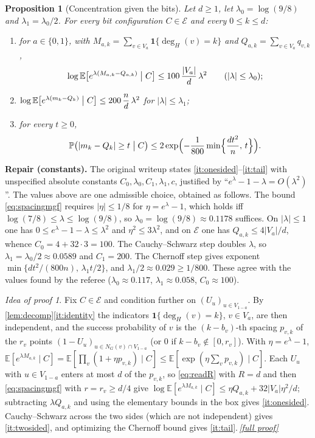 \documentclass[11pt,a4paper]{article}
\theoremstyle{plain}
\newtheorem{proposition}[theorem]{Proposition}
\theoremstyle{definition}
\theoremstyle{remark}
\newtheorem*{proofidea}{Idea of proof}
\newcommand{\fullproofref}[1]{\,\hyperref[#1]{\textit{[full proof]}}}
\newcommand{\EE}{\mathbb E}
\newcommand{\PP}{\mathbb P}
\newcommand{\ind}{\mathbf 1}
\newcommand{\cE}{\mathcal E}
\newcommand{\degH}{\deg_H}
\begin{document}
\begin{proposition}[Concentration given the bits]\label{prop:givenbits}
Let $d\ge1$, let $\lambda_0=\log(9/8)$ and $\lambda_1=\lambda_0/2$. For every bit configuration $C\in\cE$ and every $0\le k\le d$:
\begin{enumerate}[label=\textup{(\alph*)},itemsep=1pt]
\item\label{it:onesided} for $a\in\{0,1\}$, with $M_{a,k}=\sum_{v\in V_a}\ind\{\degH(v)=k\}$ and $Q_{a,k}=\sum_{v\in V_a}q_{v,k}$,
\[
 \log\EE\bigl[e^{\lambda(M_{a,k}-Q_{a,k})}\bigm|C\bigr]\le100\,\frac{|V_a|}d\,\lambda^2\qquad(|\lambda|\le\lambda_0);
\]
\item\label{it:twosided} $\log\EE\bigl[e^{\lambda(m_k-Q_k)}\bigm|C\bigr]\le200\,\dfrac nd\,\lambda^2$ for $|\lambda|\le\lambda_1$;
\item\label{it:tail} for every $t\ge0$,
\[
 \PP\bigl(|m_k-Q_k|\ge t\bigm|C\bigr)\le2\exp\Bigl(-\frac1{800}\min\Bigl\{\frac{dt^2}n,\,t\Bigr\}\Bigr).
\]
\end{enumerate}
\end{proposition}

\begin{repairbox}
\textbf{Repair (constants).} The original writeup states \ref{it:onesided}--\ref{it:tail} with unspecified absolute constants $C_0,\lambda_0,C_1,\lambda_1,c$, justified by ``$e^\lambda-1-\lambda=O(\lambda^2)$''. The values above are one admissible choice, obtained as follows. The bound \eqref{eq:spacingmgf} requires $|\eta|\le1/8$ for $\eta=e^\lambda-1$, which holds iff $\log(7/8)\le\lambda\le\log(9/8)$, so $\lambda_0=\log(9/8)\approx0.1178$ suffices. On $|\lambda|\le1$ one has $0\le e^\lambda-1-\lambda\le\lambda^2$ and $\eta^2\le3\lambda^2$, and on $\cE$ one has $Q_{a,k}\le4|V_a|/d$, whence $C_0=4+32\cdot3=100$. The Cauchy--Schwarz step doubles $\lambda$, so $\lambda_1=\lambda_0/2\approx0.0589$ and $C_1=200$. The Chernoff step gives exponent $\min\{dt^2/(800n),\,\lambda_1t/2\}$, and $\lambda_1/2\approx0.029\ge1/800$. These agree with the values found by the referee ($\lambda_0\approx0.117$, $\lambda_1\approx0.058$, $C_0\approx100$).
\end{repairbox}

\begin{proofidea}
Fix $C\in\cE$ and condition further on $(U_u)_{u\in V_{1-a}}$. By \cref{lem:decomp}\ref{it:identity} the indicators $\ind\{\degH(v)=k\}$, $v\in V_a$, are then independent, and the success probability of $v$ is the $(k-b_v)$-th spacing $p_{v,k}$ of the $r_v$ points $(1-U_u)_{u\in N_G(v)\cap V_{1-a}}$ (or $0$ if $k-b_v\notin[0,r_v]$). With $\eta=e^\lambda-1$, $\EE[e^{\lambda M_{a,k}}\mid C]=\EE[\prod_v(1+\eta p_{v,k})\mid C]\le\EE[\exp(\eta\sum_v p_{v,k})\mid C]$. Each $U_u$ with $u\in V_{1-a}$ enters at most $d$ of the $p_{v,k}$, so \eqref{eq:readR} with $R=d$ and then \eqref{eq:spacingmgf} with $r=r_v\ge d/4$ give $\log\EE[e^{\lambda M_{a,k}}\mid C]\le\eta Q_{a,k}+32|V_a|\eta^2/d$; subtracting $\lambda Q_{a,k}$ and using the elementary bounds in the box gives \ref{it:onesided}. Cauchy--Schwarz across the two sides (which are not independent) gives \ref{it:twosided}, and optimizing the Chernoff bound gives \ref{it:tail}.\fullproofref{pf:givenbits}
\end{proofidea}
\end{document}
